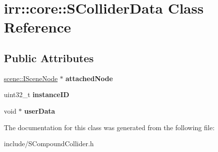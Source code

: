 \hypertarget{classirr_1_1core_1_1SColliderData}{}\section{irr\+:\+:core\+:\+:S\+Collider\+Data Class Reference}
\label{classirr_1_1core_1_1SColliderData}
\subsection*{Public Attributes}
\begin{DoxyCompactItemize}
\item 
\hyperlink{classirr_1_1scene_1_1ISceneNode}{scene\+::\+I\+Scene\+Node} $\ast$ {\bfseries attached\+Node}\hypertarget{classirr_1_1core_1_1SColliderData_a7f67799474b751d0b21c463a6f2eea3c}{}\label{classirr_1_1core_1_1SColliderData_a7f67799474b751d0b21c463a6f2eea3c}

\item 
uint32\+\_\+t {\bfseries instance\+ID}\hypertarget{classirr_1_1core_1_1SColliderData_a6779a797f1fc432007930a0929622b37}{}\label{classirr_1_1core_1_1SColliderData_a6779a797f1fc432007930a0929622b37}

\item 
void $\ast$ {\bfseries user\+Data}\hypertarget{classirr_1_1core_1_1SColliderData_ac56c5a85ff0d0f6d5f6bcec8c061157d}{}\label{classirr_1_1core_1_1SColliderData_ac56c5a85ff0d0f6d5f6bcec8c061157d}

\end{DoxyCompactItemize}


The documentation for this class was generated from the following file\+:\begin{DoxyCompactItemize}
\item 
include/S\+Compound\+Collider.\+h\end{DoxyCompactItemize}

